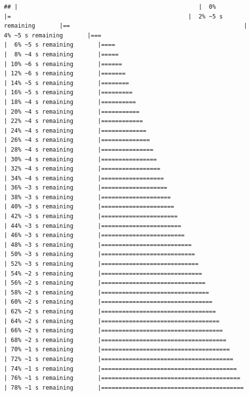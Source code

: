 \documentclass[
]{article}
\begin{document}
\begin{verbatim}
## |                                                    |  0%                      |=                                                   |  2% ~5 s remaining       |==                                                  |  4% ~5 s remaining       |===                                                 |  6% ~5 s remaining       |====                                                |  8% ~4 s remaining       |=====                                               | 10% ~6 s remaining       |======                                              | 12% ~6 s remaining       |=======                                             | 14% ~5 s remaining       |========                                            | 16% ~5 s remaining       |=========                                           | 18% ~4 s remaining       |==========                                          | 20% ~4 s remaining       |===========                                         | 22% ~4 s remaining       |============                                        | 24% ~4 s remaining       |=============                                       | 26% ~4 s remaining       |==============                                      | 28% ~4 s remaining       |===============                                     | 30% ~4 s remaining       |================                                    | 32% ~4 s remaining       |=================                                   | 34% ~4 s remaining       |==================                                  | 36% ~3 s remaining       |===================                                 | 38% ~3 s remaining       |====================                                | 40% ~3 s remaining       |=====================                               | 42% ~3 s remaining       |======================                              | 44% ~3 s remaining       |=======================                             | 46% ~3 s remaining       |========================                            | 48% ~3 s remaining       |==========================                          | 50% ~3 s remaining       |===========================                         | 52% ~3 s remaining       |============================                        | 54% ~2 s remaining       |=============================                       | 56% ~2 s remaining       |==============================                      | 58% ~2 s remaining       |===============================                     | 60% ~2 s remaining       |================================                    | 62% ~2 s remaining       |=================================                   | 64% ~2 s remaining       |==================================                  | 66% ~2 s remaining       |===================================                 | 68% ~2 s remaining       |====================================                | 70% ~1 s remaining       |=====================================               | 72% ~1 s remaining       |======================================              | 74% ~1 s remaining       |=======================================             | 76% ~1 s remaining       |========================================            | 78% ~1 s remaining       |=========================================          
\end{verbatim}
\end{document}
